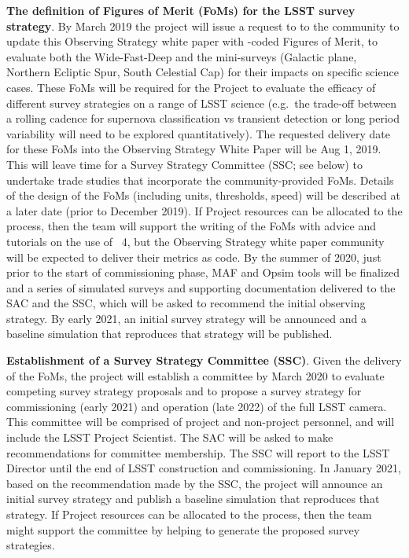 \begin{description}
\item \textbf{The definition of Figures of Merit (FoMs) for the LSST
survey strategy}. By March 2019 the project will issue a request to
to the community to update this Observing Strategy white paper with
\MAF-coded Figures of Merit, to evaluate both the Wide-Fast-Deep and the
mini-surveys (Galactic plane, Northern Ecliptic Spur, South Celestial
Cap) for their impacts on specific science cases. These FoMs will be
required for the Project to evaluate the efficacy of different survey
strategies on a range of LSST science (e.g.\ the trade-off between a
rolling cadence for supernova classification vs transient detection or
long period variability will need to be explored quantitatively). The
requested delivery date for these \MAF FoMs into the Observing Strategy
White Paper will be Aug 1, 2019. This will leave time for a Survey
Strategy Committee (SSC; see below) to undertake trade studies that
incorporate the community-provided FoMs. Details of the design of the
FoMs (including units, thresholds, speed) will be described at a later
date (prior to December 2019). If Project resources can be allocated to
the process, then the \OpSim team will support the writing
of the FoMs with advice and tutorials on the use of \OpSim~4, but
the Observing Strategy white paper community will be expected to deliver
their metrics as \MAF code.  By the summer of  2020, just prior to the
start of commissioning phase, MAF and Opsim tools will be finalized and a
series of simulated surveys and supporting documentation delivered
to the SAC and the SSC, which will be asked to recommend the initial
observing strategy. By early 2021, an initial survey strategy will be
announced and a baseline simulation that reproduces that strategy will
be published.

\item \textbf{Establishment of a Survey Strategy Committee (SSC)}. Given
the delivery of the FoMs, the project will establish a committee by March
2020 to evaluate competing survey strategy proposals and to propose a
survey strategy for commissioning (early 2021) and operation (late 2022) of the full LSST camera.
This committee will be comprised of project and non-project personnel, and
will include the LSST Project Scientist. The SAC will be asked to
make recommendations for committee membership. The SSC will report to
the LSST Director until the end of LSST construction and commissioning.
In January 2021, based on the recommendation made by the SSC, the
project will announce an initial survey strategy and publish a baseline
simulation that reproduces that strategy. If Project resources can be
allocated to the process, then the \OpSim team might support
the committee by helping to generate the proposed survey strategies.

\end{description}

